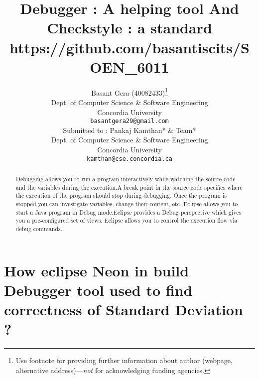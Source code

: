 \documentclass{article}
\title{Debugger : A helping tool And  Checkstyle : a standard\\ https://github.com/basantiscits/SOEN\_6011}
\author{
  Basant Gera (40082433)\thanks{Use footnote for providing further
    information about author (webpage, alternative
    address)---\emph{not} for acknowledging funding agencies.} \\
  Dept. of Computer Science \& Software Engineering\\
  Concordia University\\
  \texttt{basantgera29@gmail.com} \\
   \And
Submitted to : Pankaj Kamthan* \& Team*\\
   Dept. of Computer Science \& Software Engineering\\
  Concordia University\\
  \texttt{kamthan@cse.concordia.ca} \\
}
\begin{document}
\maketitle

\begin{abstract}
Debugging allows you to run a program interactively while watching the source code and the variables during the execution.A break point in the source code specifies where the execution of the program should stop during debugging. Once the program is stopped you can investigate variables, change their content, etc. Eclipse allows you to start a Java program in Debug mode.Eclipse provides a Debug perspective which gives you a pre-configured set of views. Eclipse allows you to control the execution flow via debug commands.
\end{abstract}

\section{ How eclipse Neon in build Debugger tool used to find correctness of Standard Deviation ?}
\end{document}
